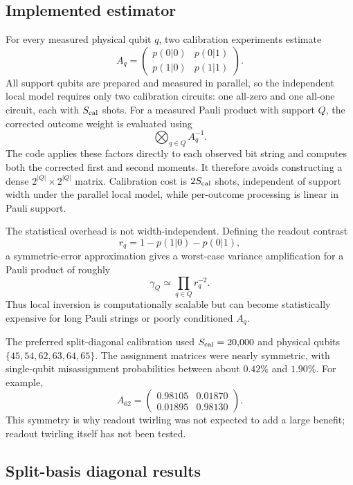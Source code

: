 \documentclass[11pt]{article}
\begin{document}
\subsection{Implemented estimator}

For every measured physical qubit $q$, two calibration experiments estimate
\[
 A_q=
 \begin{pmatrix}
 p(0|0)&p(0|1)\\
 p(1|0)&p(1|1)
 \end{pmatrix}.
\]
All support qubits are prepared and measured in parallel, so the independent
local model requires only two calibration circuits: one all-zero and one
all-one circuit, each with $S_{\rm cal}$ shots.  For a measured Pauli product
with support $Q$, the corrected outcome weight is evaluated using
\[
 \bigotimes_{q\in Q} A_q^{-1}.
\]
The code applies these factors directly to each observed bit string and
computes both the corrected first and second moments.  It therefore avoids
constructing a dense $2^{|Q|}\times2^{|Q|}$ matrix.  Calibration cost is
$2S_{\rm cal}$ shots, independent of support width under the parallel local
model, while per-outcome processing is linear in Pauli support.

The statistical overhead is not width-independent.  Defining the readout
contrast
\[
 r_q=1-p(1|0)-p(0|1),
\]
a symmetric-error approximation gives a worst-case variance amplification
for a Pauli product of roughly
\[
 \gamma_Q\simeq\prod_{q\in Q}r_q^{-2}.
\]
Thus local inversion is computationally scalable but can become statistically
expensive for long Pauli strings or poorly conditioned $A_q$.

The preferred split-diagonal calibration used $S_{\rm cal}=20{,}000$ and
physical qubits $\{45,54,62,63,64,65\}$.  The assignment matrices were nearly
symmetric, with single-qubit misassignment probabilities between about
$0.42\%$ and $1.90\%$.  For example,
\[
 A_{62}=\begin{pmatrix}
 0.98105&0.01870\\0.01895&0.98130
 \end{pmatrix}.
\]
This symmetry is why readout twirling was not expected to add a large benefit;
readout twirling itself has not been tested.

\subsection{Split-basis diagonal results}
\end{document}
